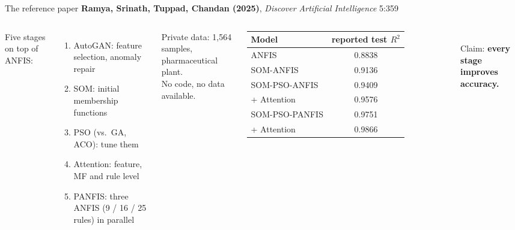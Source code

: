 \documentclass[aspectratio=169,10pt]{beamer}
\newcommand{\Rsq}{$R^2$}
\begin{document}
\begin{frame}{The reference paper}
\textbf{Ramya, Srinath, Tuppad, Chandan (2025)}, \emph{Discover Artificial Intelligence} 5:359\\[2mm]
\begin{columns}[T]
Five stages on top of ANFIS:
\begin{enumerate}\setlength\itemsep{0.5mm}
\item AutoGAN: feature selection, anomaly repair
\item SOM: initial membership functions
\item PSO (vs.\ GA, ACO): tune them
\item Attention: feature, MF and rule level
\item PANFIS: three ANFIS (9 / 16 / 25 rules) in parallel
\end{enumerate}
\vspace{2mm}
Private data: 1,564 samples, pharmaceutical plant.\\ No code, no data available.
\footnotesize
\begin{tabular}{lc}
\toprule Model & reported test \Rsq{} \\ \midrule
ANFIS & 0.8838 \\ SOM-ANFIS & 0.9136 \\ SOM-PSO-ANFIS & 0.9409 \\ + Attention & 0.9576 \\ SOM-PSO-PANFIS & 0.9751 \\ + Attention & 0.9866 \\ \bottomrule
\end{tabular}\\[2mm]
\normalsize Claim: \textbf{every stage improves accuracy.}
\end{columns}
\end{frame}
\end{document}
